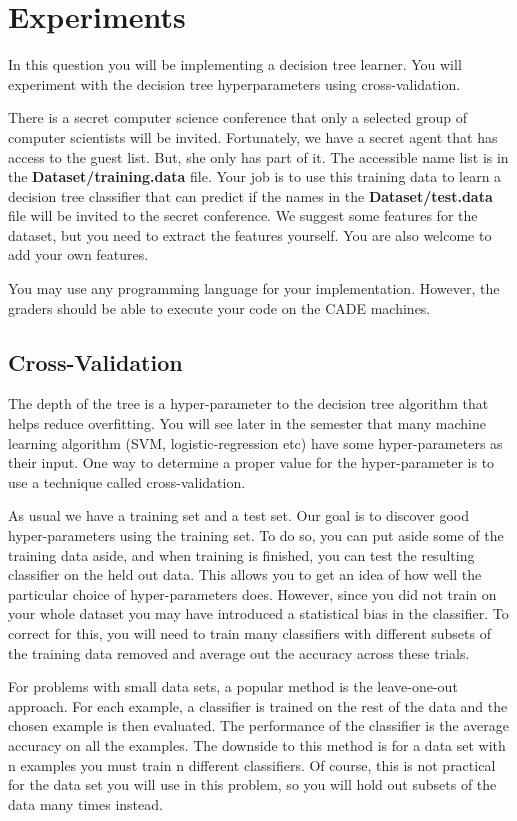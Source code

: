\section{Experiments}
\label{sec:q3}

In this question you will be implementing a decision tree learner. You will experiment with the decision tree hyperparameters using cross-validation.

There is a secret computer science conference that only a selected group of computer scientists will be invited.
Fortunately, we have a secret agent that has access to the guest list.
But, she only has part of it.
The accessible name list is in the \textbf{Dataset/training.data} file.
Your job is to use this training data to learn a decision tree classifier that can predict if the names in the \textbf{Dataset/test.data} file will be invited to the secret conference.
We suggest some features for the dataset, but you need to extract the features yourself.
You are also welcome to add your own features.

You may use any programming language for your implementation. However, the graders should be able to execute your code on the CADE machines.

\subsection*{Cross-Validation}

The depth of the tree is a hyper-parameter to the decision tree algorithm that helps reduce overfitting.
You will see later in the semester that many machine learning algorithm (SVM, logistic-regression etc) have some hyper-parameters as their input.
One way to determine a proper value for the hyper-parameter is to use a technique called cross-validation.

As usual we have a training set and a test set.
Our goal is to discover good hyper-parameters using the training set.
To do so, you can put aside some of the training data aside, and when training is finished, you can test the resulting classifier on the held out data.
This allows you to get an idea of how well the particular choice of hyper-parameters does.
However, since you did not train on your whole dataset you may have introduced a statistical bias in the classifier.
To correct for this, you will need to train many classifiers with different subsets of the training data removed and average out the accuracy across these trials.

For problems with small data sets, a popular method is the leave-one-out approach.
For each example, a classifier is trained on the rest of the data and the chosen example is then evaluated.
The performance of the classifier is the average accuracy on all the examples.
The downside to this method is for a data set with n examples you must train n different classifiers.
Of course, this is not practical for the data set you will use in this problem, so you will hold out subsets of the data many times instead.

